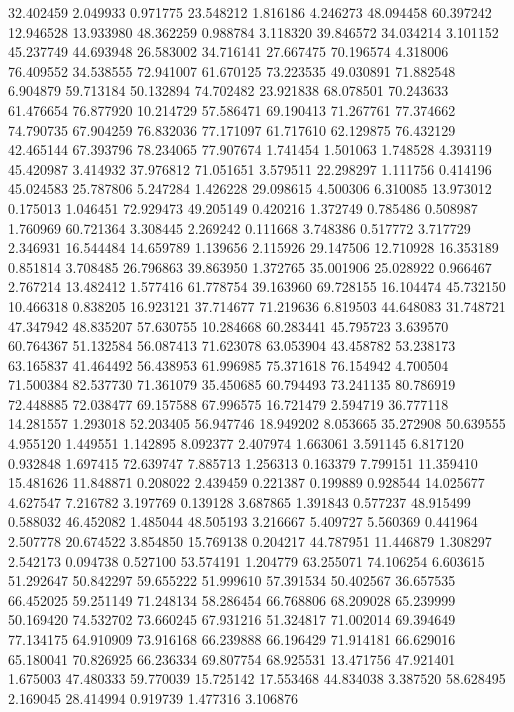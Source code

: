 32.402459
2.049933
0.971775
23.548212
1.816186
4.246273
48.094458
60.397242
12.946528
13.933980
48.362259
0.988784
3.118320
39.846572
34.034214
3.101152
45.237749
44.693948
26.583002
34.716141
27.667475
70.196574
4.318006
76.409552
34.538555
72.941007
61.670125
73.223535
49.030891
71.882548
6.904879
59.713184
50.132894
74.702482
23.921838
68.078501
70.243633
61.476654
76.877920
10.214729
57.586471
69.190413
71.267761
77.374662
74.790735
67.904259
76.832036
77.171097
61.717610
62.129875
76.432129
42.465144
67.393796
78.234065
77.907674
1.741454
1.501063
1.748528
4.393119
45.420987
3.414932
37.976812
71.051651
3.579511
22.298297
1.111756
0.414196
45.024583
25.787806
5.247284
1.426228
29.098615
4.500306
6.310085
13.973012
0.175013
1.046451
72.929473
49.205149
0.420216
1.372749
0.785486
0.508987
1.760969
60.721364
3.308445
2.269242
0.111668
3.748386
0.517772
3.717729
2.346931
16.544484
14.659789
1.139656
2.115926
29.147506
12.710928
16.353189
0.851814
3.708485
26.796863
39.863950
1.372765
35.001906
25.028922
0.966467
2.767214
13.482412
1.577416
61.778754
39.163960
69.728155
16.104474
45.732150
10.466318
0.838205
16.923121
37.714677
71.219636
6.819503
44.648083
31.748721
47.347942
48.835207
57.630755
10.284668
60.283441
45.795723
3.639570
60.764367
51.132584
56.087413
71.623078
63.053904
43.458782
53.238173
63.165837
41.464492
56.438953
61.996985
75.371618
76.154942
4.700504
71.500384
82.537730
71.361079
35.450685
60.794493
73.241135
80.786919
72.448885
72.038477
69.157588
67.996575
16.721479
2.594719
36.777118
14.281557
1.293018
52.203405
56.947746
18.949202
8.053665
35.272908
50.639555
4.955120
1.449551
1.142895
8.092377
2.407974
1.663061
3.591145
6.817120
0.932848
1.697415
72.639747
7.885713
1.256313
0.163379
7.799151
11.359410
15.481626
11.848871
0.208022
2.439459
0.221387
0.199889
0.928544
14.025677
4.627547
7.216782
3.197769
0.139128
3.687865
1.391843
0.577237
48.915499
0.588032
46.452082
1.485044
48.505193
3.216667
5.409727
5.560369
0.441964
2.507778
20.674522
3.854850
15.769138
0.204217
44.787951
11.446879
1.308297
2.542173
0.094738
0.527100
53.574191
1.204779
63.255071
74.106254
6.603615
51.292647
50.842297
59.655222
51.999610
57.391534
50.402567
36.657535
66.452025
59.251149
71.248134
58.286454
66.768806
68.209028
65.239999
50.169420
74.532702
73.660245
67.931216
51.324817
71.002014
69.394649
77.134175
64.910909
73.916168
66.239888
66.196429
71.914181
66.629016
65.180041
70.826925
66.236334
69.807754
68.925531
13.471756
47.921401
1.675003
47.480333
59.770039
15.725142
17.553468
44.834038
3.387520
58.628495
2.169045
28.414994
0.919739
1.477316
3.106876
